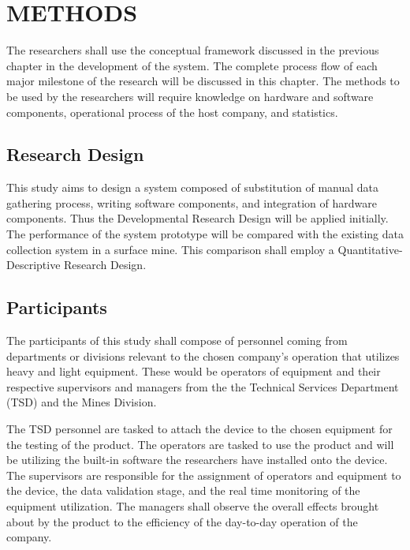 \documentclass[12pt]{report}
\begin{document}
\newpage
\printglossary[
    type=main,
    nonumberlist,
    numberedsection,
    title={Definition of Terms},
    toctitle={Definition of Terms}
]

\chapter{METHODS}

The researchers shall use the conceptual framework discussed in the previous chapter in the development of the system.
The complete process flow of each major milestone of the research will be discussed in this chapter.
The methods to be used by the researchers will require knowledge on hardware and software components, operational process of the host company, and statistics.

\section{Research Design}

This study aims to design a system composed of substitution of manual data gathering process, writing software components, and integration of hardware components.
Thus the Developmental Research Design will be applied initially.
The performance of the system prototype will be compared with the existing data collection system in a surface mine.
This comparison shall employ a Quantitative-Descriptive Research Design.

\section{Participants}

The participants of this study shall compose of personnel coming from departments or divisions relevant to the chosen company's operation that utilizes heavy and light equipment. 
These would be operators of equipment and their respective supervisors and managers from the the Technical Services Department (TSD) and the Mines Division. 

The TSD personnel are tasked to attach the device to the chosen equipment for the testing of the product.
The operators are tasked to use the product and will be utilizing the built-in software the researchers have installed onto the device.
The supervisors are responsible for the assignment of operators and equipment to the device, the data validation stage, and the real time monitoring of the equipment utilization.
The managers shall observe the overall effects brought about by the product to the efficiency of the day-to-day operation of the company.
\end{document}
